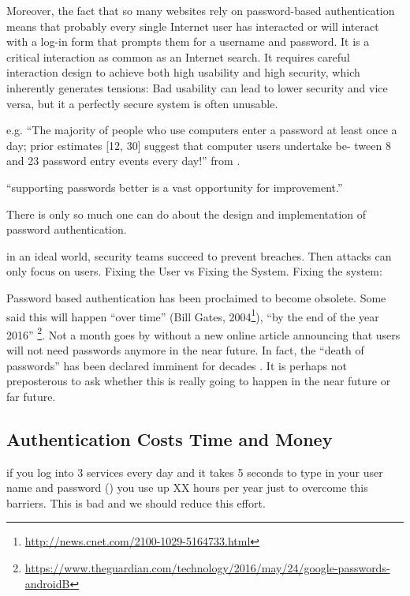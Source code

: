 Moreover, the fact that so many websites rely on password-based authentication means that probably every single Internet user has interacted or will interact with a log-in form that prompts them for a username and password. It is a critical interaction as common as an Internet search. It requires careful interaction design to achieve both high usability and high security, which inherently generates tensions: Bad usability can lead to lower security and vice versa, but it a perfectly secure system is often unusable. 

 e.g. ``The majority of people who use computers enter a password at least once a day; prior estimates [12, 30] suggest that computer users undertake be- tween 8 and 23 password entry events every day!'' from \cite{Wash2016UnderstandingPasswordChoices}.

``supporting passwords better is a vast opportunity for improvement.'' \cite{Herley2012PersistenceOfPasswords}



There is only so much one can do about the design and implementation of password authentication. 

in an ideal world, security teams succeed to prevent breaches. Then attacks can only focus on users. 
Fixing the User vs Fixing the System. Fixing the system: \cite{Schmidt2013Pitfalls}

Password based authentication has been proclaimed to become obsolete. Some said this will happen ``over time'' (Bill Gates, 2004\footnote{\url{http://news.cnet.com/2100-1029-5164733.html}}), ``by the end of the year 2016'' \footnote{\url{https://www.theguardian.com/technology/2016/may/24/google-passwords-androidB}}. Not a month goes by without a new online article announcing that users will not need passwords anymore in the near future. In fact, the ``death of passwords'' has been declared imminent for decades \cite{Herley2012PersistenceOfPasswords, Bonneau2012ReplacePasswords}. It is perhaps not preposterous to ask whether this is really going to happen in the near future or far future. 


\subsection{Authentication Costs Time and Money}
if you log into 3 services every day and it takes 5 seconds to type in your user name and password (\ar) you use up XX hours per year just to overcome this barriers. This is bad and we should reduce this effort. 

